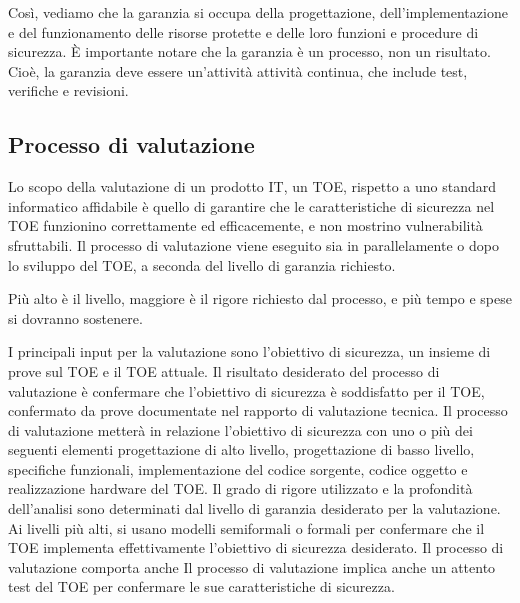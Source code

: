 Così, vediamo che la garanzia si occupa della progettazione, dell'implementazione e del funzionamento delle risorse protette e delle loro funzioni e procedure di sicurezza. È importante notare che la garanzia è un processo, non un risultato. Cioè, la garanzia deve essere un'attività attività continua, che include test, verifiche e revisioni.

\newpage
\subsection{Processo di valutazione}
Lo scopo della valutazione di un prodotto IT, un TOE, rispetto a uno standard informatico affidabile è quello di garantire che le caratteristiche di sicurezza nel TOE funzionino correttamente ed efficacemente, e non mostrino vulnerabilità sfruttabili. Il processo di valutazione viene eseguito sia in parallelamente o dopo lo sviluppo del TOE, a seconda del livello di garanzia richiesto.

\singlespacing

Più alto è il livello, maggiore è il rigore richiesto dal processo, e più tempo e spese si dovranno sostenere.

\singlespacing

I principali input per la valutazione sono l'obiettivo di sicurezza, un insieme di prove sul TOE e il TOE attuale. Il risultato desiderato del processo di valutazione è confermare che l'obiettivo di sicurezza è soddisfatto per il TOE, confermato da prove documentate nel rapporto di valutazione tecnica. Il processo di valutazione metterà in relazione l'obiettivo di sicurezza con uno o più dei seguenti elementi progettazione di alto livello, progettazione di basso livello, specifiche funzionali, implementazione del codice sorgente, codice oggetto e realizzazione hardware del TOE. Il grado di rigore utilizzato e la profondità dell'analisi sono determinati dal livello di garanzia desiderato per la valutazione. Ai livelli più alti, si usano modelli semiformali o formali per confermare che il TOE implementa effettivamente l'obiettivo di sicurezza desiderato. Il processo di valutazione comporta anche Il processo di valutazione implica anche un attento test del TOE per confermare le sue caratteristiche di sicurezza.

\singlespacing

